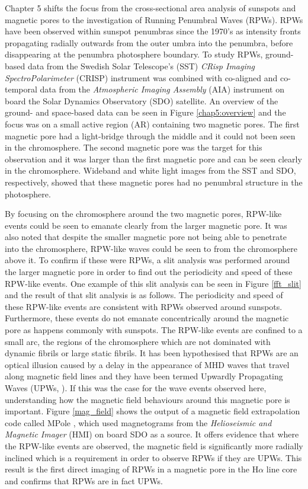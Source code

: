     Chapter 5 shifts the focus from the cross-sectional area analysis of sunspots and magnetic pores to the investigation of Running Penumbral Waves (RPWs).
    RPWs have been observed within sunspot penumbras since the 1970's as intensity fronts propagating radially outwards from the outer umbra into the penumbra, before disappearing at the penumbra photosphere boundary.
    To study RPWs, ground-based data from the Swedish Solar Telescope's (SST) \textit{CRisp Imaging SpectroPolarimeter} (CRISP) instrument was combined with co-aligned and co-temporal data from the \textit{Atmospheric Imaging Assembly} (AIA) instrument on board the Solar Dynamics Observatory (SDO) satellite.
    An overview of the ground- and space-based data can be seen in Figure \ref{chap5:overview} and the focus was on a small active region (AR) containing two magnetic pores.
    The first magnetic pore had a light-bridge through the middle and it could not been seen in the chromosphere.
    The second magnetic pore was the target for this observation and it was larger than the first magnetic pore and can be seen clearly in the chromosphere. 
    Wideband and white light images from the SST and SDO, respectively, showed that these magnetic pores had no penumbral structure in the photosphere.
    
    By focusing on the chromosphere around the two magnetic pores, RPW-like events could be seen to emanate clearly from the larger magnetic pore.
    It was also noted that despite the smaller magnetic pore not being able to penetrate into the chromosphere, RPW-like waves could be seen to from the chromosphere above it. 
    To confirm if these were RPWs, a slit analysis was performed around the larger magnetic pore in order to find out the periodicity and speed of these RPW-like events.
    One example of this slit analysis can be seen in Figure \ref{fft_slit} and the result of that slit analysis is as follows.
    The periodicity and speed of these RPW-like events are consistent with RPWs observed around sunspots.
    Furthermore, these events do not emanate concentrically around the magnetic pore as happens commonly with sunspots.
    The RPW-like events are confined to a small arc, the regions of the chromosphere which are not dominated with dynamic fibrils or large static fibrils.
    It has been hypothesised that RPWs are an optical illusion caused by a delay in the appearance of MHD waves that travel along magnetic field lines and they have been termed Upwardly Propagating Waves (UPWs, \citealt{Bloomfiel2008}).
    If this was the case for the wave events observed here, understanding how the magnetic field behaviours around this magnetic pore is important. 
	Figure \ref{mag_field} shows the output of a magnetic field extrapolation code called MPole \citep{Longcope1996,Longcope2002}, which used magnetograms from the \textit{Helioseismic and Magnetic Imager} (HMI) on board SDO as a source.
	It offers evidence that where the RPW-like events are observed, the magnetic field is significantly more radially inclined which is a requirement in order to observe RPWs if they are UPWs. 
	This result is the first direct imaging of RPWs in a magnetic pore in the H$\alpha$ line core and confirms that RPWs are in fact UPWs.
	 
